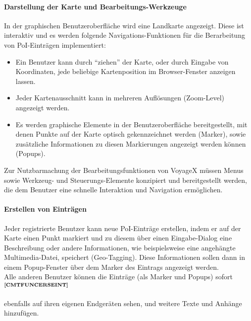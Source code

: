 \paragraph{Darstellung der Karte und Bearbeitungs-Werkzeuge}
In der graphischen Benutzeroberfläche wird eine Landkarte angezeigt. Diese ist interaktiv und es werden
folgende Navigations-Funktionen für die Berarbeitung von PoI-Einträgen implementiert:
\begin{itemize}
  \item Ein Benutzer kann durch "`ziehen"' der Karte, oder durch Eingabe von Koordinaten, jede beliebige Kartenposition im Browser-Fenster anzeigen lassen.
  \item Jeder Kartenausschnitt kann in mehreren Auflösungen (Zoom-Level) angezeigt werden.
  \item Es werden graphische Elemente in der Benutzeroberfläche bereitgestellt, mit denen Punkte auf der Karte optisch gekennzeichnet werden (Marker), sowie zusätzliche Informationen zu diesen Markierungen angezeigt werden können (Popups).
\end{itemize}
Zur Nutzbarmachung der Bearbeitungsfunktionen von VoyageX müssen Menus sowie Werkzeug- und Steuerungs-Elemente konzipiert und bereitgestellt werden, die dem Benutzer eine schnelle Interaktion und Navigation ermöglichen.

\paragraph{Erstellen von Einträgen}
Jeder registrierte Benutzer kann neue PoI-Einträge erstellen, indem er auf der Karte einen Punkt markiert und zu diesem über einen Eingabe-Dialog eine Beschreibung oder andere Informationen, wie beispielsweise eine angehängte Multimedia-Datei, speichert (Geo-Tagging). Diese Informationen sollen dann in einem Popup-Fenster über dem Marker des Eintrags angezeigt werden.\\
Alle anderen Benutzer können die Einträge (als Marker und Popups) sofort$^{\textbf{\ref{CMTFUNCERSEINT}}}$%
\addtocounter{footnote}{1}%
 ebenfalls auf ihren eigenen Endgeräten sehen, und weitere Texte und Anhänge hinzufügen.

